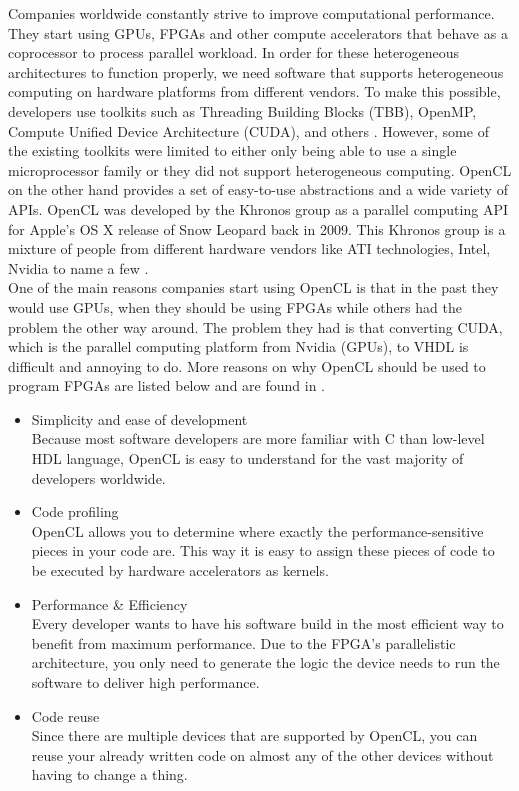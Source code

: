\documentclass[a4paper, 11pt]{report}
\begin{document}
Companies worldwide constantly strive to improve computational performance. They start using GPUs, FPGAs and other compute accelerators that behave as a coprocessor to process parallel workload. In order for these heterogeneous architectures to function properly, we need software that supports heterogeneous computing on hardware platforms from different vendors. To make this possible, developers use toolkits such as Threading Building Blocks (TBB), OpenMP, Compute Unified Device Architecture (CUDA), and others \cite{stone2010opencl}. However, some of the existing toolkits were limited to either only being able to use a single microprocessor family or they did not support heterogeneous computing. OpenCL on the other hand provides a set of easy-to-use abstractions and a wide variety of APIs. OpenCL was developed by the Khronos group as a parallel computing API for Apple's OS X release of Snow Leopard back in 2009. This Khronos group is a mixture of people from different hardware vendors like ATI technologies, Intel, Nvidia to name a few \cite{KhronosMembers}.\\
One of the main reasons companies start using OpenCL is that in the past they would use GPUs, when they should be using FPGAs while others had the problem the other way around. The problem they had is that converting CUDA, which is the parallel computing platform from Nvidia (GPUs), to VHDL is difficult and annoying to do. More reasons on why OpenCL should be used to program FPGAs are listed below and are found in \cite{fpgaForDummies}.
\begin{itemize}
	\item {Simplicity and ease of development}\\
	Because most software developers are more familiar with C than low-level HDL language, OpenCL is easy to understand for the vast majority of developers worldwide.
	\item {Code profiling}\\
OpenCL allows you to determine where exactly the performance-sensitive pieces in your code are. This way it is easy to assign these pieces of code to be executed by hardware accelerators as kernels.
	\item {Performance \& Efficiency}\\
Every developer wants to have his software build in the most efficient way to benefit from maximum performance. Due to the FPGA's parallelistic architecture, you only need to generate the logic the device needs to run the software to deliver high performance.
	\item {Code reuse}\\
Since there are multiple devices that are supported by OpenCL, you can reuse your already written code on almost any of the other devices without having to change a thing.
\end{itemize}
\end{document}

